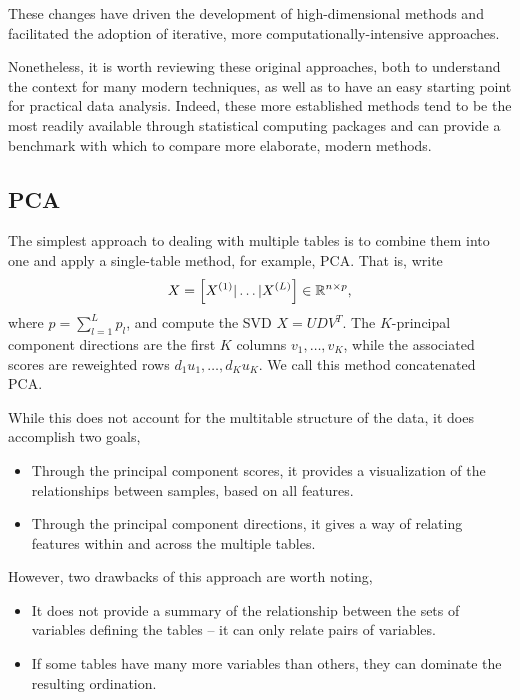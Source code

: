 \documentclass{article}
\begin{document}
These changes have driven the development of high-dimensional methods and
facilitated the adoption of iterative, more computationally-intensive
approaches.

Nonetheless, it is worth reviewing these original approaches, both to understand
the context for many modern techniques, as well as to have an easy starting
point for practical data analysis. Indeed, these more established methods tend
to be the most readily available through statistical computing packages and can
provide a benchmark with which to compare more elaborate, modern methods.

\subsection{PCA}
\label{subsec:pca}

The simplest approach to dealing with multiple tables is to combine them into
one and apply a single-table method, for example, PCA. That is, write
\begin{align*}
X = \left[X^{(1)} \vert \dots \vert X^{(L)}\right] \in \mathbb{R}^{n \times p},
\end{align*}
where $p = \sum_{l = 1}^{L}p_{l}$, and compute the SVD $X = UDV^{T}$. The
$K$-principal component directions are the first $K$ columns $v_{1}, \dots,
v_{K}$, while the associated scores are reweighted rows $d_{1}u_{1}, \dots,
d_{K}u_{K}$. We call this method concatenated PCA.

While this does not account for the multitable structure of the data, it does
accomplish two goals,
\begin{itemize}
\item Through the principal component scores, it provides a visualization of the
  relationships between samples, based on all features.
\item Through the principal component directions, it gives a way of relating
  features within and across the multiple tables.
\end{itemize}

However, two drawbacks of this approach are worth noting,
\begin{itemize}
  \item It does not provide a summary of the relationship between the sets of
    variables defining the tables -- it can only relate pairs of
    variables.
  \item If some tables have many more variables than others, they can dominate
    the resulting ordination.
\end{itemize}
\end{document}
